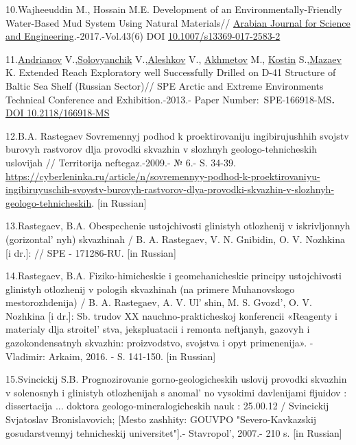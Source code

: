 \begin{references}
10.Wajheeuddin M., Hossain M.E. Development of an
Environmentally-Friendly Water-Based Mud System Using Natural
Materials//
\href{https://www.researchgate.net/journal/Arabian-Journal-for-Science-and-Engineering-2191-4281?_tp=eyJjb250ZXh0Ijp7ImZpcnN0UGFnZSI6InB1YmxpY2F0aW9uIiwicGFnZSI6InB1YmxpY2F0aW9uIn19}{Arabian
Journal for Science and Engineering}.-2017.-Vol.43(6) DOI
\href{https://doi.org/10.1007/s13369-017-2583-2}{10.1007/s13369-017-2583-2}

11.\href{javascript:;}{Andrianov} V.,\href{javascript:;}{Solovyanchik}
V.,\href{javascript:;}{Aleshkov} V., \href{javascript:;}{Akhmetov} M.,
\href{javascript:;}{Kostin} S.,\href{javascript:;}{Mazaev} K. Extended
Reach Exploratory well Successfully Drilled on D-41 Structure of Baltic
Sea Shelf (Russian Sector)// SPE Arctic and Extreme Environments
Technical Conference and Exhibition.-2013.- Paper
Number:~SPE-166918-MS{\bfseries .}
\href{https://doi.org/10.2118/166918-MS}{DOI 10.2118/166918-MS}

12.B.A. Rastegaev Sovremennyj podhod k proektirovaniju ingibirujushhih
svojstv burovyh rastvorov dlja provodki skvazhin v slozhnyh
geologo-tehnicheskih uslovijah // Territorija neftegaz.-2009.- № 6.- S.
34-39.
\url{https://cyberleninka.ru/article/n/sovremennyy-podhod-k-proektirovaniyu-ingibiruyuschih-svoystv-burovyh-rastvorov-dlya-provodki-skvazhin-v-slozhnyh-geologo-tehnicheskih}.
{[}in Russian{]}

13.Rastegaev, B.A. Obespechenie ustojchivosti glinistyh otlozhenij v
iskrivljonnyh (gorizontal' nyh) skvazhinah / B. A.
Rastegaev, V. N. Gnibidin, O. V. Nozhkina {[}i dr.{]}: // SPE -
171286-RU. {[}in Russian{]}

14.Rastegaev, B.A. Fiziko-himicheskie i geomehanicheskie principy
ustojchivosti glinistyh otlozhenij v pologih skvazhinah (na primere
Muhanovskogo mestorozhdenija) / B. A. Rastegaev, A. V.
Ul' shin, M. S. Gvozd', O. V. Nozhkina
{[}i dr.{]}: Sb. trudov XX nauchno-prakticheskoj konferencii «Reagenty i
materialy dlja stroitel' stva, jekspluatacii i remonta
neftjanyh, gazovyh i gazokondensatnyh skvazhin: proizvodstvo, svojstva i
opyt primenenija». - Vladimir: Arkaim, 2016. - S. 141-150. {[}in
Russian{]}

15.Svincickij S.B. Prognozirovanie gorno-geologicheskih uslovij provodki
skvazhin v solenosnyh i glinistyh otlozhenijah s
anomal' no vysokimi davlenijami fljuidov : dissertacija
... doktora geologo-mineralogicheskih nauk : 25.00.12 / Svincickij
Svjatoslav Bronislavovich; {[}Mesto zashhity: GOUVPO "Severo-Kavkazskij
gosudarstvennyj tehnicheskij universitet"{]}.-
Stavropol', 2007.- 210 s. {[}in Russian{]}


\end{references}
